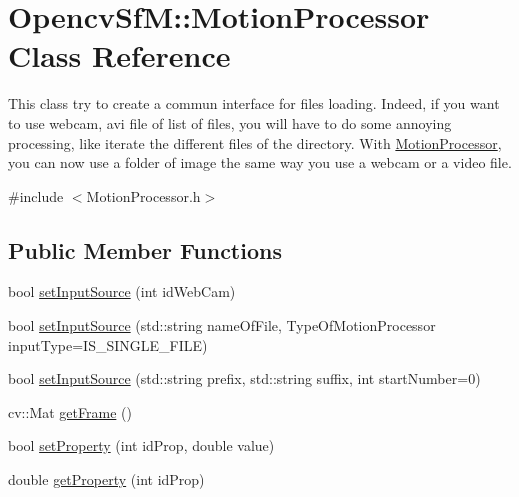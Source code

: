 \hypertarget{class_opencv_sf_m_1_1_motion_processor}{
\section{OpencvSfM::MotionProcessor Class Reference}
\label{class_opencv_sf_m_1_1_motion_processor}
}


This class try to create a commun interface for files loading. Indeed, if you want to use webcam, avi file of list of files, you will have to do some annoying processing, like iterate the different files of the directory. With \hyperlink{class_opencv_sf_m_1_1_motion_processor}{MotionProcessor}, you can now use a folder of image the same way you use a webcam or a video file.  




{\ttfamily \#include $<$MotionProcessor.h$>$}

\subsection*{Public Member Functions}
\begin{DoxyCompactItemize}
\item 
bool \hyperlink{class_opencv_sf_m_1_1_motion_processor_a7a14674a19924a56943e9887f0895dee}{setInputSource} (int idWebCam)
\item 
bool \hyperlink{class_opencv_sf_m_1_1_motion_processor_ae590078740f3cbdd3f32f403f0044c2e}{setInputSource} (std::string nameOfFile, TypeOfMotionProcessor inputType=IS\_\-SINGLE\_\-FILE)
\item 
bool \hyperlink{class_opencv_sf_m_1_1_motion_processor_a3afbdfe67a99a1484e7c64d5f7a2c3b2}{setInputSource} (std::string prefix, std::string suffix, int startNumber=0)
\item 
cv::Mat \hyperlink{class_opencv_sf_m_1_1_motion_processor_a2314d6d47c9318b1dc61515ce20cf819}{getFrame} ()
\item 
bool \hyperlink{class_opencv_sf_m_1_1_motion_processor_a32865291f286da0855b6aee7f726fa77}{setProperty} (int idProp, double value)
\item 
double \hyperlink{class_opencv_sf_m_1_1_motion_processor_a6528cf81ad216d235aa6e2b504384ce6}{getProperty} (int idProp)
\end{DoxyCompactItemize}
